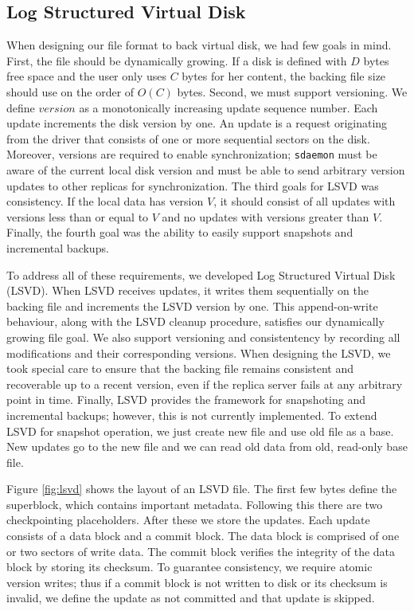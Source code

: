 \subsection{Log Structured Virtual Disk}
\label{sec:lsvd}

When designing our file format to back virtual disk, we had few goals in mind. First, the file should be dynamically growing. If a disk is defined with $D$ bytes free space and the user only uses $C$ bytes for her content, the backing file size should use on the order of $O(C)$ bytes. Second, we must support versioning. We define $version$ as a monotonically increasing update sequence number. Each update increments the disk version by one. An update is a request originating from the driver that consists of one or more sequential sectors on the disk. Moreover, versions are required to enable synchronization; \texttt{sdaemon} must be aware of the current local disk version and must be able to send arbitrary version updates to other replicas for synchronization. The third goals for LSVD was consistency. If the local data has version $V$, it should consist of all updates with versions less than or equal to $V$ and no updates with versions greater than $V$. Finally, the fourth goal was the ability to easily support snapshots and incremental backups.

To address all of these requirements, we developed Log Structured Virtual Disk (LSVD). When LSVD receives updates, it writes them sequentially on the backing file and increments the LSVD version by one. This append-on-write behaviour, along with the LSVD cleanup procedure, satisfies our dynamically growing file goal. We also support versioning and consistentency by recording all modifications and their corresponding versions. When designing the LSVD, we took special care to ensure that the backing file remains consistent and recoverable up to a recent version, even if the replica server fails at any arbitrary point in time. Finally, LSVD provides the framework for snapshoting and incremental backups; however, this is not currently implemented. To extend LSVD for snapshot operation, we just create new file and use old file as a base. New updates go to the new file and we can read old data from old, read-only base file. 

Figure \ref{fig:lsvd} shows the layout of an LSVD file. The first few bytes define the superblock, which contains important metadata. Following this there are two checkpointing placeholders. After these we store the updates. Each update consists of a data block and a commit block. The data block is comprised of one or two sectors of write data. The commit block verifies the integrity of the data block by storing its checksum. To guarantee consistency, we require atomic version writes; thus if a commit block is not written to disk or its checksum is invalid, we define the update as not committed and that update is skipped.

